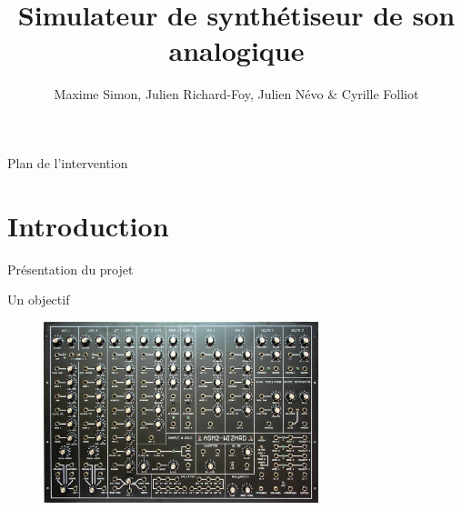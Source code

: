 \documentclass[frenchb]{beamer}
\title[M2GL-VET]{Simulateur de synthétiseur de son analogique}
\author{Maxime Simon, Julien Richard-Foy, Julien Névo \& Cyrille Folliot}
\institute[ISTIC]{Université de Rennes 1}
\begin{document}
\begin{frame}
    \titlepage
\end{frame}
	
	
\begin{frame}{Plan de l'intervention}
    \tableofcontents
\end{frame}
\section{Introduction}


\begin{frame}{Présentation du projet}
\end{frame}

\begin{frame}{Un objectif}
    \begin{figure}
        \includegraphics[width=8cm ]{../img/png/synth.jpg}
    \end{figure}
\end{frame}
\end{document}
